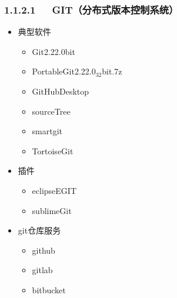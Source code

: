 \documentclass[letterpaper,12pt,english]{sphinxmanual}
\begin{document}
\subsubsection{1.1.2.1   GIT（分布式版本控制系统）}
\label{\detokenize{001software/001install/_u7248_u672c_u63a7_u5236_u8f6f_u4ef6:git}}\begin{itemize}
\item {} 
典型软件
\begin{itemize}
\item {} 
Git\sphinxhyphen{}2.22.0\sphinxhyphen{}\sphinxhyphen{}bit

\item {} 
PortableGit\sphinxhyphen{}2.22.0\sphinxhyphen{}$_{\text{32}}$\sphinxhyphen{}bit.7z

\item {} 
GitHubDesktop

\item {} 
sourceTree

\item {} 
smartgit

\item {} 
TortoiseGit

\end{itemize}

\item {} 
插件
\begin{itemize}
\item {} 
eclipse\sphinxhyphen{}EGIT

\item {} 
sublimeGit

\end{itemize}

\item {} 
git仓库服务
\begin{itemize}
\item {} 
github

\item {} 
gitlab

\item {} 
bitbucket

\end{itemize}

\end{itemize}
\end{document}
